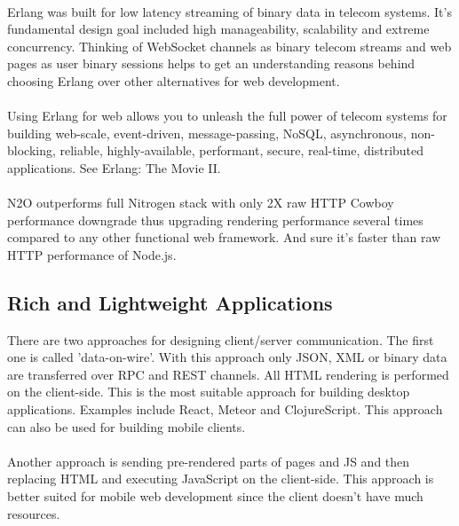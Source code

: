
\paragraph{}
Erlang was built for low latency streaming of binary data in telecom systems.
It's fundamental design goal included high manageability, scalability
and extreme concurrency. Thinking of WebSocket channels as binary
telecom streams and web pages as user binary sessions
helps to get an understanding reasons behind choosing Erlang
over other alternatives for web development.

\paragraph{}
Using Erlang for web allows you to unleash the full power of telecom systems for
building web-scale, event-driven, message-passing, NoSQL, asynchronous, non-blocking,
reliable, highly-available, performant, secure, real-time, distributed applications.
See Erlang: The Movie II.

\paragraph{}
N2O outperforms full Nitrogen stack with only 2X raw HTTP Cowboy
performance downgrade thus upgrading rendering performance several
times compared to any other functional web framework. And
sure it's faster than raw HTTP performance of Node.js.

\subsection{Rich and Lightweight Applications}
There are two approaches for designing client/server communication.
The first one is called 'data-on-wire'. With this approach only JSON, XML or binary
data are transferred over RPC and REST channels. All HTML rendering
is performed on the client-side. This is the most suitable approach for building desktop
applications. Examples include React, Meteor and ClojureScript.
This approach can also be used for building mobile clients.

\paragraph{}
Another approach is sending pre-rendered parts of pages and JS
and then replacing HTML and executing JavaScript on the client-side. This approach
is better suited for mobile web development since the
client doesn't have much resources.

